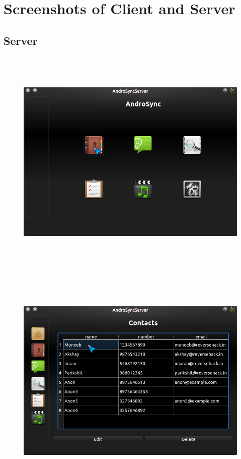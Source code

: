 \chapter{Screenshots of Client and Server}
\section{Server}
\vspace{2cm}
\begin{figure}[H]
  \centering
    \includegraphics[height= 11cm, width=17cm]{project/images/AndroSyncServer/AndroSyncServer_Home}
\end{figure}
\newpage
\begin{figure}[H]
  \centering
    \includegraphics[height= 11cm, width=17cm]{project/images/AndroSyncServer/AndroSyncServer_Contacts}
\end{figure}
